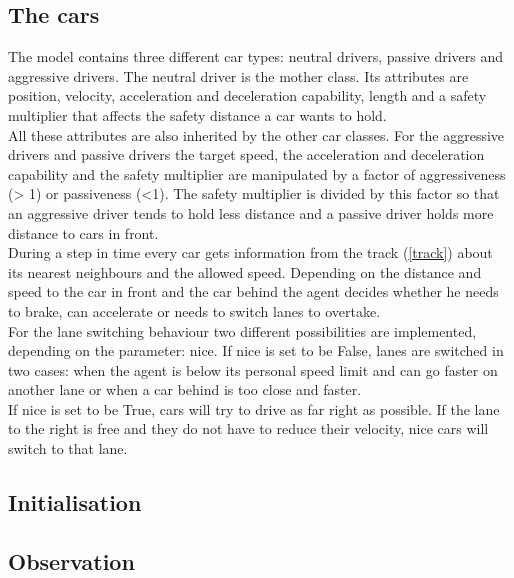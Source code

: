 \documentclass[11pt,a4paper,twocolumn]{article}
\begin{document}
\subsection{The cars} \label{cars}
The model contains three different car types: neutral drivers, passive drivers and aggressive drivers. The neutral driver is the mother class. Its attributes are position, velocity, acceleration and deceleration capability, length and a safety multiplier that affects the safety distance a car wants to hold. \\
All these attributes are also inherited by the other car classes. For the aggressive drivers and passive drivers the target speed, the acceleration and deceleration capability and the safety multiplier are manipulated by a factor of aggressiveness (> 1) or passiveness (<1). The safety multiplier is divided by this factor so that an aggressive driver tends to hold less distance and a passive driver holds more distance to cars in front. \\
During a step in time every car gets information from the track (\ref{track}) about its nearest neighbours and the allowed speed. Depending on the distance and speed to the car in front and the car behind the agent decides whether he needs to brake, can accelerate or needs to switch lanes to overtake. \\
For the lane switching behaviour two different possibilities are implemented, depending on the parameter: nice. If nice is set to be False, lanes are switched in two cases: when the agent is below its personal speed limit and can go faster on another lane or when a car behind is too close and faster.\\
If nice is set to be True, cars will try to drive as far right as possible. If the lane to the right is free and they do not have to reduce their velocity, nice cars will switch to that lane. 

\subsection{Initialisation}

\subsection{Observation}

\end{document}
